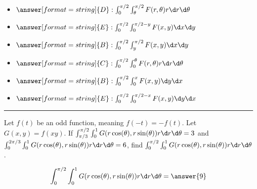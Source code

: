 \documentclass{ximera}
\begin{document}
\begin{problem}
  \begin{itemize}
    \item[] $\answer[format=string]{D}: \int_0^{\pi/2} \int_{\theta}^{\pi/2}F(r,\theta)r \d r\d\theta$
    \item[] $\answer[format=string]{E}: \int_0^{\pi/2} \int_{0}^{\pi/2-y}F(x,y) \d x\d y$
    \item[] $\answer[format=string]{B}: \int_0^{\pi/2} \int_{y}^{\pi/2}F(x,y) \d x\d y$
    \item[] $\answer[format=string]{C}: \int_0^{\pi/2} \int_0^{\theta}F(r,\theta)r \d r\d \theta$
    \item[] $\answer[format=string]{B}: \int_0^{\pi/2} \int_{0}^{x}F(x,y) \d y\d x$
    \item[] $\answer[format=string]{E}: \int_0^{\pi/2} \int_{0}^{\pi/2-x}F(x,y) \d y\d x$
    \pdfOnly{\end{multicols}}
  \end{itemize}
\end{problem}

\hrule

\begin{problem}
  Let $f(t)$ be an odd function, meaning $f(-t) = -f(t)$. Let $G(x,y)
  = f(xy)$. If $\int_{\pi/3}^{\pi/2} \int_0^1 G(r \cos(\theta),r\sin(\theta))r\d r\d\theta = 3$ and $\int_{0}^{2\pi/3} \int_0^1 G(r \cos(\theta),r\sin(\theta))r\d r\d\theta = 6$, find  $\int_{0}^{\pi/2} \int_0^1 G(r \cos(\theta),r\sin(\theta))r\d r\d\theta$.
  \begin{prompt}
  \[
  \int_{0}^{\pi/2} \int_0^1 G(r \cos(\theta),r\sin(\theta))r\d r\d\theta = \answer{9}
  \]
  \end{prompt}
\end{problem}

\vfill
\end{document}
